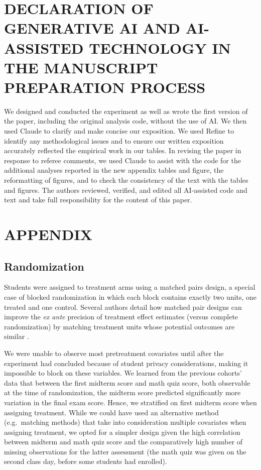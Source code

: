 \section*{DECLARATION OF GENERATIVE AI AND AI-ASSISTED TECHNOLOGY IN THE MANUSCRIPT PREPARATION PROCESS}
We designed and conducted the experiment as well as wrote the first version of the paper, including the original analysis code, without the use of AI.
We then used Claude to clarify and make concise our exposition.
We used Refine to identify any methodological issues and to ensure our written exposition accurately reflected the empirical work in our tables.
In revising the paper in response to referee comments, we used Claude to assist with the code for the additional analyses reported in the new appendix tables and figure, the reformatting of figures, and to check the consistency of the text with the tables and figures.
The authors reviewed, verified, and edited all AI-assisted code and text and take full responsibility for the content of this paper.

\printbibliography

\clearpage
\section*{APPENDIX}

\subsection{Randomization} \label{subsubsec:a_randomization}
Students were assigned to treatment arms using a matched pairs design, a special case of blocked randomization in which each block contains exactly two units, one treated and one control.
Several authors detail how matched pair designs can improve the \textit{ex ante} precision of treatment effect estimates (versus complete randomization) by matching treatment units whose potential outcomes are similar \parencite[e.g.,][]{ir2015, ai2017}.

We were unable to observe most pretreatment covariates until after the experiment had concluded because of student privacy considerations, making it impossible to block on these variables.
We learned from the previous cohorts' data that between the first midterm score and math quiz score, both observable at the time of randomization, the midterm score predicted significantly more variation in the final exam score.
Hence, we stratified on first midterm score when assigning treatment.
While we could have used an alternative method (e.g.\ matching methods) that take into consideration multiple covariates when assigning treatment, we opted for a simpler design given the high correlation between midterm and math quiz score and the comparatively high number of missing observations for the latter assessment (the math quiz was given on the second class day, before some students had enrolled).

